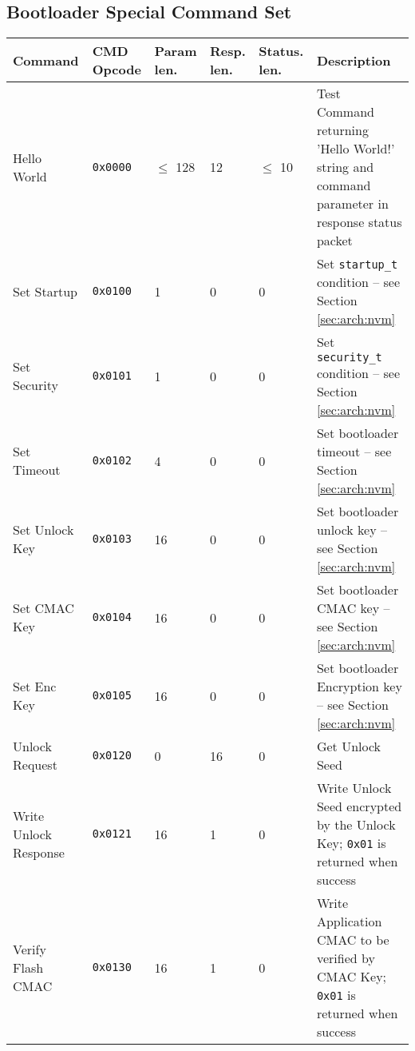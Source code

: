    
\subsection{Bootloader Special Command Set}



\begin{table*}[!ht]
  \hspace*{-4cm}
  \begin{tabular}{| p{3cm} | p{1.5cm} | p{1cm} | p{1cm} | p{1cm} | p{4.5cm} | }
      \hline
      \rowcolor{SeaGreen3!30!} {\bf Command} & {\bf CMD Opcode} & {\bf Param len.} & {\bf Resp. len.} & {\bf Status. len.} & {\bf Description} \\
      \hline
      \hline
      Hello World & \texttt{0x0000} & $\leq$ 128 & 12 & $\leq$ 10 & Test Command returning 'Hello World!' string and command parameter in response status packet \\
      \hline
      Set Startup & \texttt{0x0100} & 1 & 0 & 0 & Set \texttt{startup\_t} condition -- see Section \ref{sec:arch:nvm} \\
      \hline
      Set Security & \texttt{0x0101} & 1 & 0 & 0 & Set \texttt{security\_t} condition -- see Section \ref{sec:arch:nvm} \\
      \hline
      Set Timeout & \texttt{0x0102} & 4 & 0 & 0 & Set bootloader timeout -- see Section \ref{sec:arch:nvm} \\
      \hline
      Set Unlock Key & \texttt{0x0103} & 16 & 0 & 0 & Set bootloader unlock key -- see Section \ref{sec:arch:nvm} \\
      \hline
      Set CMAC Key & \texttt{0x0104} & 16 & 0 & 0 & Set bootloader CMAC key -- see Section \ref{sec:arch:nvm} \\
      \hline
      Set Enc Key & \texttt{0x0105} & 16 & 0 & 0 & Set bootloader Encryption key -- see Section \ref{sec:arch:nvm} \\
      \hline
      Unlock Request & \texttt{0x0120} & 0 & 16 & 0 & Get Unlock Seed \\
      \hline
      Write Unlock Response & \texttt{0x0121} & 16 & 1 & 0 & Write Unlock Seed encrypted by the Unlock Key; \texttt{0x01} is returned when success\\
      \hline
      Verify Flash CMAC & \texttt{0x0130} & 16 & 1 & 0 & Write Application CMAC to be verified by CMAC Key; \texttt{0x01} is returned when success\\
      \hline
  \end{tabular}
  \label{tab:specCmd}
 \end{table*}
   
